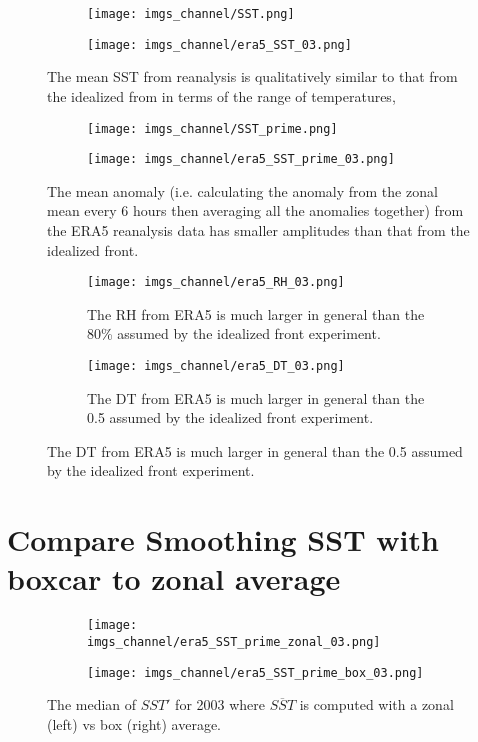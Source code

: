 \documentclass[12pt,a4paper]{article}
\begin{document}
\begin{figure}[h!]
\centering
\begin{subfigure}[t]{0.49\textwidth}
\texttt{[image: imgs\_channel/SST.png]}
\end{subfigure}
\begin{subfigure}[t]{0.49\textwidth}
\texttt{[image: imgs\_channel/era5\_SST\_03.png]}
\end{subfigure}
\caption{The mean SST from reanalysis is qualitatively similar to that from the idealized from in terms of the range of temperatures, }
\end{figure}

\begin{figure}[h!]
\centering
\begin{subfigure}[t]{0.49\textwidth}
\texttt{[image: imgs\_channel/SST\_prime.png]}
\end{subfigure}
\begin{subfigure}[t]{0.49\textwidth}
\texttt{[image: imgs\_channel/era5\_SST\_prime\_03.png]}
\end{subfigure}
\caption{The mean anomaly (i.e. calculating the anomaly from the zonal mean every 6 hours then averaging all the anomalies together) from the ERA5 reanalysis data has smaller amplitudes than that from the idealized front.}
\end{figure}

\begin{figure}[h!]
\centering
\begin{subfigure}[t]{0.49\textwidth}
\texttt{[image: imgs\_channel/era5\_RH\_03.png]}
\caption{The RH from ERA5 is much larger in general than the 80\% assumed by the idealized front experiment.}
\end{subfigure}
\begin{subfigure}[t]{0.49\textwidth}
\texttt{[image: imgs\_channel/era5\_DT\_03.png]}
\caption{The DT from ERA5 is much larger in general than the 0.5 assumed by the idealized front experiment.}
\end{subfigure}

\end{figure}

\section{Compare Smoothing SST with boxcar to zonal average}

\begin{figure}[h!]
\centering
\begin{subfigure}[t]{0.49\textwidth}
\texttt{[image: imgs\_channel/era5\_SST\_prime\_zonal\_03.png]}
\end{subfigure}
\begin{subfigure}[t]{0.49\textwidth}
\texttt{[image: imgs\_channel/era5\_SST\_prime\_box\_03.png]}
\end{subfigure}
\caption{The median of $SST'$ for 2003 where $\overline{SST}$ is computed with a zonal (left) vs box (right) average.}
\end{figure}
\end{document}
